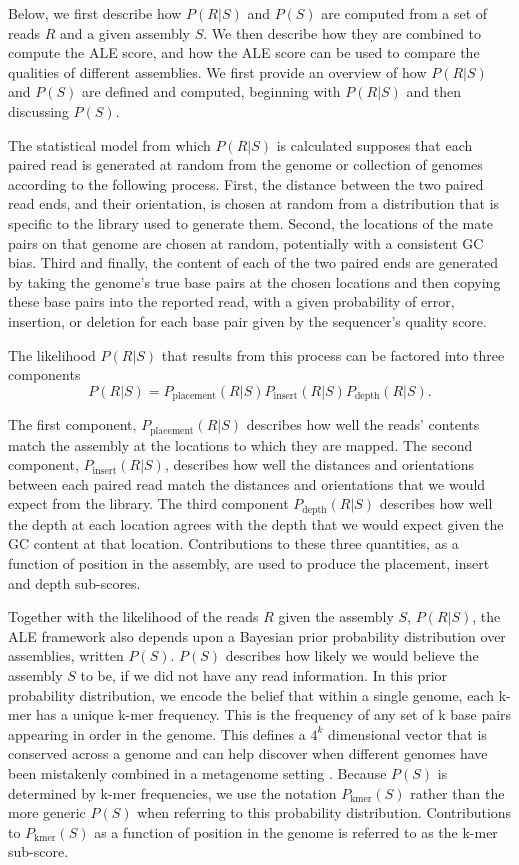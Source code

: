 \documentclass[phd,tocprelim]{cornell}
\begin{document}
Below, we first describe how $P(R|S)$ and $P(S)$ are computed from a set of reads $R$ and a given assembly $S$.  We then describe how they are combined to compute the ALE score, and how the ALE score can be used to compare the qualities of different assemblies. We first provide an overview of how $P(R|S)$ and $P(S)$ are defined and computed, beginning with $P(R|S)$ and then discussing $P(S)$.

The statistical model from which $P(R|S)$ is calculated supposes that each paired read is generated at random from the genome or collection of genomes according to the following process.  First, the distance between the two paired read ends, and their orientation, is chosen at random from a distribution that is specific to the library used to generate them.  Second, the locations of the mate pairs on that genome are chosen at random, potentially with a consistent GC bias.  Third and finally, the content of each of the two paired ends are generated by taking the genome's true base pairs at the chosen locations and then copying these base pairs into the reported read, with a given probability of error, insertion, or deletion for each base pair given by the sequencer's quality score.

The likelihood $P(R|S)$ that results from this process can be factored into three components
\begin{equation}
    P(R|S)=P_{\text{placement}}(R|S)P_{\text{insert}}(R|S)P_{\text{depth}}(R|S).
\end{equation}

The first component, $P_{\text{placement}}(R|S)$ describes how well the reads' contents match the assembly at the locations to which they are mapped. The second component, $P_{\text{insert}}(R|S)$, describes how well the distances and orientations between each paired read match the distances and orientations that we would expect from the library.  The third component $P_{\text{depth}}(R|S)$ describes how well the depth at each location agrees with the depth that we would expect given the GC content at that location. Contributions to these three quantities, as a function of position in the assembly, are used to produce the placement, insert and depth sub-scores.

Together with the likelihood of the reads $R$ given the assembly $S$, $P(R|S)$, the ALE framework also depends upon a Bayesian prior probability distribution over assemblies, written $P(S)$.  $P(S)$ describes how likely we would believe the assembly $S$ to be, if we did not have any read information.  In this prior probability distribution, we encode the belief that within a single genome, each k-mer has a unique k-mer frequency. This is the frequency of any set of k base pairs appearing in order in the genome. This defines a $4^{k}$ dimensional vector that is conserved across a genome and can help discover when different genomes have been mistakenly combined in a metagenome setting \cite{Teeling2004} \cite{Woyke2006}. Because $P(S)$ is determined by k-mer frequencies, we use the notation $P_{\text{kmer}}(S)$ rather than the more generic $P(S)$ when referring to this probability distribution. Contributions to $P_{\text{kmer}}(S)$ as a function of position in the genome is referred to as the k-mer sub-score.
\end{document}
